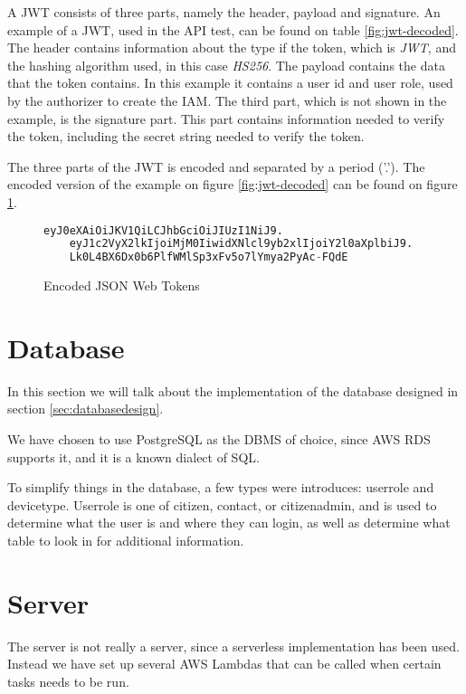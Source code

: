 A JWT consists of three parts, namely the header, payload and signature. An example of a JWT, used in the API test, can be found on table \ref{fig:jwt-decoded}. The header contains information about the type if the token, which is \textit{JWT}, and the hashing algorithm used, in this case \textit{HS256}. The payload contains the data that the token contains. In this example it contains a user id and user role, used by the authorizer to create the IAM. The third part, which is not shown in the example, is the signature part. This part contains information needed to verify the token, including the secret string needed to verify the token.

The three parts of the JWT is encoded and separated by a period  ('.'). The encoded version of the example on figure \ref{fig:jwt-decoded} can be found on figure \ref{fig:jwt-encoded}.

\begin{figure}[H]
    \centering
    \begin{lstlisting}[language=Python]
    eyJ0eXAiOiJKV1QiLCJhbGciOiJIUzI1NiJ9.
    eyJ1c2VyX2lkIjoiMjM0IiwidXNlcl9yb2xlIjoiY2l0aXplbiJ9.
    Lk0L4BX6Dx0b6PlfWMlSp3xFv5o7lYmya2PyAc-FQdE
\end{lstlisting}
    \caption{Encoded JSON Web Tokens}
    \label{fig:jwt-encoded}
\end{figure}






\section{Database}


In this section we will talk about the implementation of the database designed in section \ref{sec:databasedesign}. 

We have chosen to use PostgreSQL as the DBMS of choice, since AWS RDS supports it, and it is a known dialect of SQL.

To simplify things in the database, a few types were introduces: userrole and devicetype. Userrole is one of citizen, contact, or  citizenadmin, and is used to determine what the user is and where they can login, as well as determine what table to look in for additional information.

\section{Server}
The server is not really a server, since a serverless implementation has been used. Instead we have set up several AWS Lambdas that can be called when certain tasks needs to be run.

